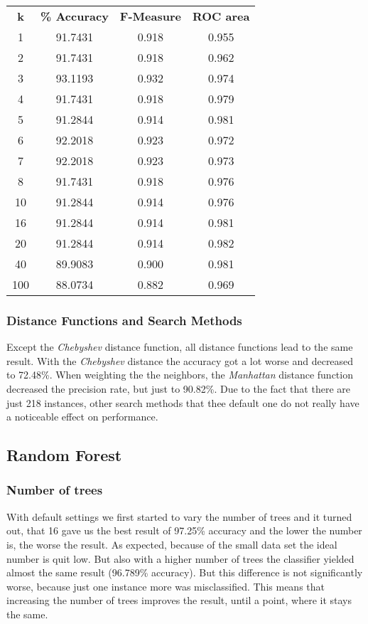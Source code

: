 \documentclass{article}
\begin{document}
 \begin{center}
\begin{tabular}{ c | c | c | c }
\textbf{k} & \textbf{\% Accuracy} & \textbf{F-Measure} & \textbf{ROC area} \\
1 & 91.7431 & 0.918 & 0.955 \\
2 & 91.7431 & 0.918 & 0.962 \\
3 & 93.1193 & 0.932 & 0.974 \\
4 & 91.7431 & 0.918 & 0.979 \\
5 & 91.2844 & 0.914 & 0.981 \\
6 & 92.2018 & 0.923 & 0.972 \\
7 & 92.2018 & 0.923 & 0.973 \\
8 & 91.7431 & 0.918 & 0.976 \\
10 & 91.2844 & 0.914 & 0.976 \\
16 & 91.2844 & 0.914 & 0.981 \\
20 & 91.2844 & 0.914 & 0.982 \\
40 & 89.9083 & 0.900 & 0.981 \\
100 & 88.0734 & 0.882 & 0.969 \\
\end{tabular}
\end{center}
 
\subsubsection{Distance Functions and Search Methods}
 
Except the \emph{Chebyshev} distance function, all distance functions lead to the same result. With the \emph{Chebyshev} distance the accuracy got a lot worse and decreased to 72.48\%. When weighting the the neighbors, the \emph{Manhattan} distance function decreased the precision rate, but just to 90.82\%. Due to the fact that there are just 218 instances, other search methods that thee default one do not really have a noticeable effect on performance.
 
\subsection{Random Forest}
 
\subsubsection{Number of trees}
 
With default settings we first started to vary the number of trees and it turned out, that 16 gave us the best result of 97.25\% accuracy and the lower the number is, the worse the result. As expected, because of the small data set the ideal number is quit low. But also with a higher number of trees the classifier yielded almost the same result (96.789\% accuracy). But this difference is not significantly worse, because just one instance more was misclassified. This means that increasing the number of trees improves the result, until a point, where it stays the same.
 
\end{document}

